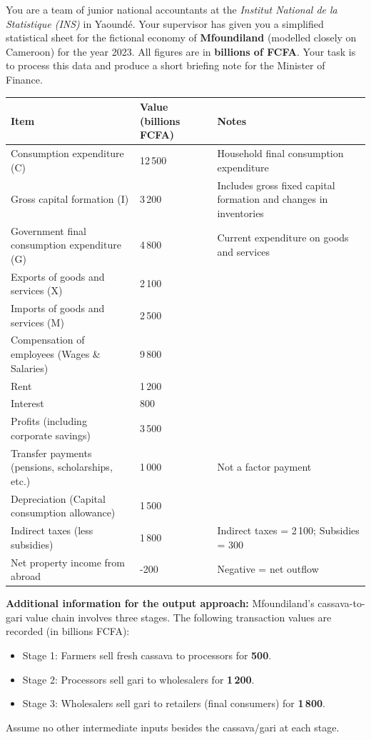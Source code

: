 \documentclass[11pt]{article}
\newcounter{popsec}
\newcounter{popsub}
\newcommand{\courssub}[1]{%
  \stepcounter{popsub}%
  \par\vspace{9pt}\noindent{\popxbold\fontsize{11.5}{13}\selectfont\color{popink}{\color{poporange}\thepopsec.\thepopsub}\hspace{6pt}#1}\par\nopagebreak\vspace{4pt}
}
\begin{document}
\courssub{Situation}
You are a team of junior national accountants at the \emph{Institut National de la Statistique (INS)} in Yaoundé. Your supervisor has given you a simplified statistical sheet for the fictional economy of \textbf{Mfoundiland} (modelled closely on Cameroon) for the year 2023. All figures are in \textbf{billions of FCFA}. Your task is to process this data and produce a short briefing note for the Minister of Finance.

\begin{center}
\begin{tabularx}{\linewidth}{|l|X|X|}
\hline
\rowcolor{popblueL}
\textbf{Item} & \textbf{Value (billions FCFA)} & \textbf{Notes} \\
\hline
Consumption expenditure (C) & 12\,500 & Household final consumption expenditure \\
Gross capital formation (I) & 3\,200 & Includes gross fixed capital formation and changes in inventories \\
Government final consumption expenditure (G) & 4\,800 & Current expenditure on goods and services \\
Exports of goods and services (X) & 2\,100 & \\
Imports of goods and services (M) & 2\,500 & \\
\hline
Compensation of employees (Wages \& Salaries) & 9\,800 & \\
Rent & 1\,200 & \\
Interest & 800 & \\
Profits (including corporate savings) & 3\,500 & \\
\hline
Transfer payments (pensions, scholarships, etc.) & 1\,000 & Not a factor payment \\
Depreciation (Capital consumption allowance) & 1\,500 & \\
Indirect taxes (less subsidies) & 1\,800 & Indirect taxes = 2\,100; Subsidies = 300 \\
Net property income from abroad & -200 & Negative = net outflow \\
\hline
\end{tabularx}
\end{center}

\textbf{Additional information for the output approach:} Mfoundiland's cassava-to-gari value chain involves three stages. The following transaction values are recorded (in billions FCFA):
\begin{itemize}
    \item Stage 1: Farmers sell fresh cassava to processors for \textbf{500}.
    \item Stage 2: Processors sell gari to wholesalers for \textbf{1\,200}.
    \item Stage 3: Wholesalers sell gari to retailers (final consumers) for \textbf{1\,800}.
\end{itemize}
Assume no other intermediate inputs besides the cassava/gari at each stage.
\end{document}
